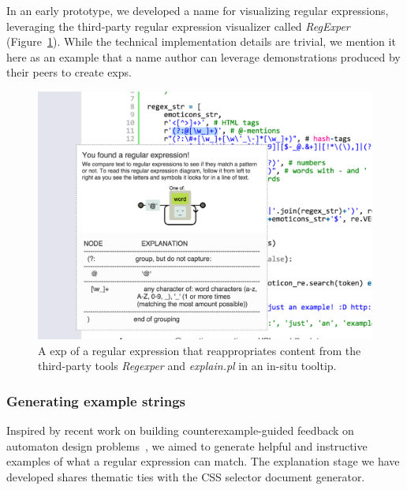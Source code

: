 In an early prototype, we developed a \Gls{name} for visualizing regular expressions, leveraging the third-party regular expression visualizer called \emph{RegExper} (Figure~\ref{fig:regex_visualization}).
While the technical implementation details are trivial, we mention it here as an example that a \Gls{name} author can leverage demonstrations produced by their peers to create \glspl{exp}.

\begin{figure}
\centering
\includegraphics[width=\columnwidth]{figures/explain_on_select}
\caption{A \gls{exp} of a regular expression that reappropriates content from the third-party tools \emph{Regexper} and \emph{explain.pl} in an in-situ tooltip.}
\label{fig:regex_visualization}
\end{figure}

\subsubsection{Generating example strings}

Inspired by recent work on building counterexample-guided feedback on automaton design problems~\cite{dantoni_how_2015}, we aimed to generate helpful and instructive examples of what a regular expression can match.
The explanation stage we have developed shares thematic ties with the CSS selector document generator. 
\fi

